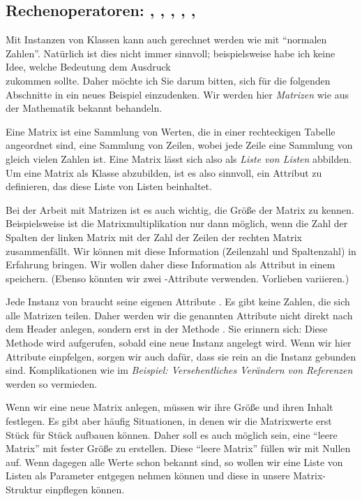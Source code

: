 \subsection{Rechenoperatoren: , , , , , }
Mit Instanzen von Klassen kann auch gerechnet werden wie mit \enquote{normalen Zahlen}. Natürlich ist dies nicht immer sinnvoll; beispielsweise habe ich keine Idee, welche Bedeutung dem Ausdruck\\
 zukommen sollte. Daher möchte ich Sie darum bitten, sich für die folgenden Abschnitte in ein neues Beispiel einzudenken. Wir werden hier \emph{Matrizen} wie aus der Mathematik bekannt behandeln.

Eine Matrix ist eine Sammlung von Werten, die in einer rechteckigen Tabelle angeordnet sind, \ie eine Sammlung von Zeilen, wobei jede Zeile eine Sammlung von gleich vielen Zahlen ist. Eine Matrix lässt sich also als \emph{Liste von Listen} abbilden. Um eine Matrix als Klasse abzubilden, ist es also sinnvoll, ein Attribut  zu definieren, das diese Liste von Listen beinhaltet.

Bei der Arbeit mit Matrizen ist es auch wichtig, die Größe der Matrix zu kennen. Beispielsweise ist die Matrixmultiplikation nur dann möglich, wenn die Zahl der Spalten der linken Matrix mit der Zahl der Zeilen der rechten Matrix zusammenfällt. Wir können mit  diese Information (Zeilenzahl und Spaltenzahl) in Erfahrung bringen. Wir wollen daher diese Information als Attribut  in einem  speichern. (Ebenso könnten wir zwei -Attribute  verwenden. Vorlieben variieren.)

Jede Instanz von  braucht seine eigenen Attribute . Es gibt keine Zahlen, die sich alle Matrizen teilen. Daher werden wir die genannten Attribute nicht direkt nach dem Header  anlegen, sondern erst in der Methode . Sie erinnern sich: Diese Methode wird aufgerufen, sobald eine neue Instanz angelegt wird. Wenn wir hier Attribute einpfelgen, sorgen wir auch dafür, dass sie rein an die Instanz gebunden sind. Komplikationen wie im \emph{Beispiel: Versehentliches Verändern von Referenzen} werden so vermieden.

Wenn wir eine neue Matrix anlegen, müssen wir ihre Größe und ihren Inhalt festlegen. Es gibt aber häufig Situationen, in denen wir die Matrixwerte erst Stück für Stück aufbauen können. Daher soll es auch möglich sein, eine \enquote{leere Matrix} mit fester Größe zu erstellen. Diese \enquote{leere Matrix} füllen wir mit Nullen auf. Wenn dagegen alle Werte schon bekannt sind, so wollen wir eine Liste von Listen als Parameter entgegen nehmen können und diese in unsere Matrix-Struktur einpflegen können.

